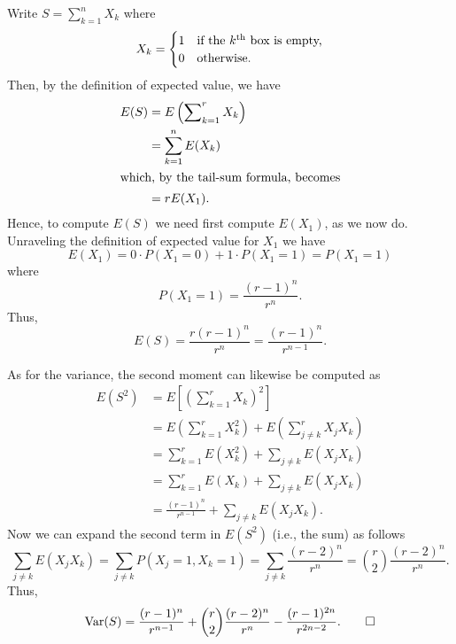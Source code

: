 \begin{solution*}
  Write \(S=\sum_{k=1}^n X_k\) where
  \[
    X_k
    =
    \begin{cases}
      1&\text{if the \(k\)\textsuperscript{th} box is empty,}\\
      0&\text{otherwise.}
    \end{cases}
  \]
  Then, by the definition of expected value, we have
  \begin{align*}
    E(S)
    &=E\left(\sum\nolimits_{k=1}^r X_k\right)\\
    &=\sum_{k=1}^n E(X_k)\\
    \shortintertext{which, by the tail-sum formula, becomes}
    &=rE(X_1).
  \end{align*}
  Hence, to compute \(E(S)\) we need first compute \(E(X_1)\), as we now
  do. Unraveling the definition of expected value for \(X_1\) we have
  \[
    E(X_1)=0\cdot P(X_1=0)+1\cdot P(X_1=1)=P(X_1=1)
  \]
  where
  \[
    P(X_1=1)=\frac{(r-1)^n}{r^n}.
  \]
  Thus,
  \[
    E(S)=\frac{r(r-1)^n}{r^n}=\frac{(r-1)^n}{r^{n-1}}.
  \]

  As for the variance, the second moment can likewise be computed as
  \begin{align*}
    E(S^2)
    &=E\left[\left(\sum\nolimits_{k=1}^r X_k\right)^2\right]\\
    &=E\left(\sum\nolimits_{k=1}^r X_k^2\right)
      +E\left(\sum\nolimits_{j\neq k}^r X_jX_k\right)\\
    &=\sum_{k=1}^r E(X_k^2)+\sum_{j\neq k} E(X_jX_k)\\
    &=\sum_{k=1}^r E(X_k)+\sum_{j\neq k}E(X_jX_k)\\
    &=\frac{(r-1)^n}{r^{n-1}}+\sum_{j\neq k}E(X_jX_k).
  \end{align*}
  Now we can expand the second term in \(E(S^2)\) (i.e., the sum) as
  follows
  \[
    \sum_{j\neq k}E(X_jX_k)=%
    \sum_{j\neq k}P(X_j=1,X_k=1)=%
    \sum_{j\neq k}\frac{(r-2)^n}{r^n}=%
    \binom{r}{2}\frac{(r-2)^n}{r^n}.
  \]
  Thus,
  \[
    \Var(S)=%
    \frac{(r-1)^n}{r^{n-1}}+%
    \binom{r}{2}\frac{(r-2)^n}{r^n}-%
    \frac{(r-1)^{2n}}{r^{2n-2}}.\qedhere
  \]
\end{solution*}

